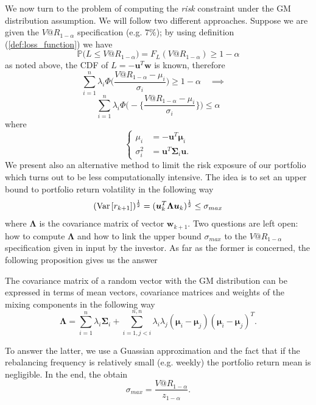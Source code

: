 We now turn to the problem of computing the \textit{risk} constraint under the GM distribution assumption. We will follow two different approaches. Suppose we are given the $V@R_{1-\alpha}$ specification (e.g. $7\%$); by using definition (\ref{def:loss_function}) we have \[ \mathbb{P}\big(L \leq V@R_{1-\alpha} \big) = F_L(V@R_{1-\alpha}) \geq 1-\alpha \] as noted above, the CDF of $L = -\bm{u}^T \bm{w}$ is known, therefore \[\sum_{i=1}^{n}\lambda_i \Phi\Big(\frac{V@R_{1-\alpha} - \mu_i}{\sigma_i}\Big) \geq 1-\alpha \quad \implies \quad\]
\begin{equation}
 \boxed{\sum_{i=1}^{n}\lambda_i \Phi\Big(-\Big\{\frac{V@R_{1-\alpha} - \mu_i}{\sigma_i} \Big\} \Big) \leq \alpha}  
\end{equation}
where \[
\begin{cases}
\mu_i & = -\bm{u}^T \bm{\mu}_i \\
\sigma_i^2 & = \bm{u}^T \bm{\Sigma}_i \bm{u}.
\end{cases}\]
We present also an alternative method to limit the risk exposure of our portfolio which turns out to be less computationally intensive. The idea is to set an upper bound to portfolio return volatility in the following way 
\begin{equation}\label{eq:risk_upperbnd}
(\operatorname{Var}\left[r_{k+1}\right])^{\frac{1}{2}} = (\bm{u}_k^T \bm{\Lambda} \bm{u}_k)^{\frac{1}{2}} \leq \sigma_{max}
\end{equation}
where $\bm{\Lambda}$ is the covariance matrix of vector $\bm{w}_{k+1}$. Two questions are left open: how to compute $\bm{\Lambda}$ and how to link the upper bound $\sigma_{max}$ to the $V@R_{1-\alpha}$ specification given in input by the investor. As far as the former is concerned, the following proposition gives us the answer
\begin{proposition}
	The covariance matrix of a random vector with the GM distribution can be expressed in terms of mean vectors, covariance matrices and weights of the mixing components in the following way
	\[ \bm{\Lambda} = \sum_{i=1}^{n}\lambda_i\bm{\Sigma}_i + \sum_{i=1,j<i}^{n,n} \lambda_i\lambda_j(\bm{\mu}_i-\bm{\mu}_j)(\bm{\mu}_i-\bm{\mu}_j)^T.\]
\end{proposition}
To answer the latter, we use a Guassian approximation and the fact that if the rebalancing frequency is relatively small (e.g. weekly) the portfolio return mean is negligible. In the end, the obtain
\[ \sigma_{max} = \frac{V@R_{1-\alpha}}{z_{1-\alpha}}. \] 
